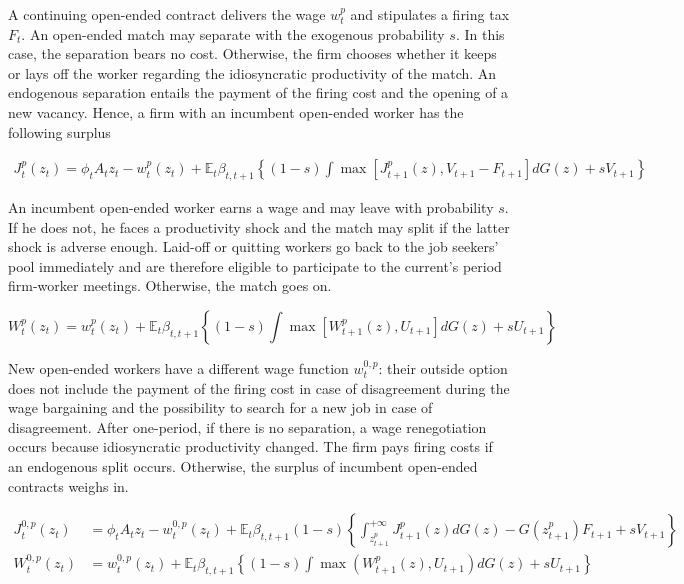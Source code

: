 A continuing open-ended contract delivers the wage $w_{t}^{p}$ and stipulates a firing tax $F_t$. An open-ended match may separate with the exogenous probability $s$. In this case, the separation bears no cost. Otherwise, the firm chooses whether it keeps or lays off the worker regarding the idiosyncratic productivity of the match. An endogenous separation entails the payment of the firing cost and the opening of a new vacancy. Hence, a firm with an incumbent open-ended worker has the following surplus

\begin{align} \label{eq:def_jp}
J_t^p \left( z_{t} \right) = \phi_t A_t z_{t} - w_{t}^{p} \left( z_t \right) + \mathbb{E}_{t} \beta_{t,t+1} \left\{ (1-s) \int \max \left[ J_{t+1}^{p} \left( z \right), V_{t+1} - F_{t+1} \right] dG(z) + s V_{t+1} \right\}
\end{align}

An incumbent open-ended worker earns a wage and may leave with probability $s$. If he does not, he faces a productivity shock and the match may split if the latter shock is adverse enough. Laid-off or quitting workers go back to the job seekers' pool immediately and are therefore eligible to participate to the current's period firm-worker meetings. Otherwise, the match goes on.

\begin{equation} \label{eq:def_wp}
W_t^p \left( z_t \right) = w_{t}^{p} \left( z_t \right) + \mathbb{E}_{t} \beta_{t,t+1} \left\{ (1-s) \int \max \left[ W_{t+1}^p ( z ), U_{t+1} \right]  dG(z) + s U_{t+1} \right\}
\end{equation}

New open-ended workers have a different wage function $w_t^{0,p}$: their outside option does not include the payment of the firing cost in case of disagreement during the wage bargaining and the possibility to search for a new job in case of disagreement. After one-period, if there is no separation, a wage renegotiation occurs because idiosyncratic productivity changed. The firm pays firing costs if an endogenous split occurs. Otherwise, the surplus of incumbent open-ended contracts weighs in. 

\begin{align} \label{eq:def_j0p} 
J_t^{0,p} \left( z_{t} \right) &= \phi_t A_t z_{t} - w_{t}^{0,p} \left( z_t \right) + \mathbb{E}_{t} \beta_{t,t+1} (1-s) \left\{ \int_{z_{t+1}^p}^{+\infty} J_{t+1}^{p} \left( z \right) dG(z) - G\left(z_{t+1}^p\right) F_{t+1} + s V_{t+1} \right\}\\
W_t^{0,p} \left( z_t \right) &= w_{t}^{0,p} \left( z_t \right) + \mathbb{E}_{t} \beta_{t,t+1} \left\{ (1-s) \int \max \left( W_{t+1}^p ( z ), U_{t+1} \right) dG(z) + s U_{t+1} \right\}
\end{align} 

